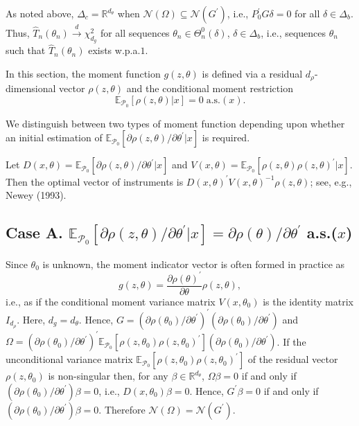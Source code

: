 \documentclass[hidelinks, 11 pt, a4paper, pdflatex]{article}
\begin{document}
{  \setcounter{equation}{0}

  \indent As noted above, $\Delta_{c} = \mathbb{R}^{d_{\theta }}$ when $\mathcal{N}(\Omega) \subseteq \mathcal{N}(G^{\prime})$, i.e., $P_{0}^{\prime}G\delta = 0$ for all $\delta \in \Delta_{b}$. Thus, $\hat{T}_{n}(\theta_{n}) \overset{d}{\rightarrow} \chi_{d_{g}}^{2}$ for all sequences $\theta_{n} \in \Theta_{n}^{0}(\delta)$, $\delta \in \Delta_{b}$, i.e., sequences $\theta_{n}$ such that $\hat{T}_{n}(\theta_{n})$ exists w.p.a.$1$.

  In this section, the moment function $g(z,\theta )$ is defined via a residual $d_{\rho}$-dimensional vector $\rho(z,\theta)$ and the conditional moment restriction
   \[
    \mathbb{E}_{\mathcal{P}_{0}}[\rho(z,\theta)|x] = 0 \; \text{a.s.}(x).
   \]

  We distinguish between two types of moment function depending upon whether an initial estimation of $\mathbb{E}_{\mathcal{P}_{0}}[\partial \rho(z,\theta)/\partial \theta^{\prime}|x]$ is required.

  Let $D(x,\theta) = \mathbb{E}_{\mathcal{P}_{0}}[\partial \rho(z,\theta)/\partial \theta^{\prime }|x]$ and $V(x,\theta) = \mathbb{E}_{\mathcal{P}_{0}}[\rho(z,\theta)\rho(z,\theta)^{\prime}|x]$. Then the optimal vector of instruments is $D(x,\theta)^{\prime}V(x,\theta)^{-1}\rho(z,\theta)$; see, e.g., Newey (1993).


  \subsection{Case A. $\mathbb{E}_{\mathcal{P}_{0}}[\partial \rho (z,\theta )/\partial \theta^{\prime}|x] = \partial \rho(\theta)/\partial \theta^{\prime}$ a.s.($x$)}

   Since $\theta_{0}$ is unknown, the moment indicator vector is often formed in practice as
    \[
     g(z,\theta) = \frac{\partial \rho(\theta)^{\prime}}{\partial \theta} \rho(z,\theta),
    \]
  i.e., as if the conditional moment variance matrix $V(x,\theta_0)$ is the identity matrix $I_{d_{\rho}}$. Here, $d_{g} = d_{\theta}$. Hence, $G = (\partial \rho(\theta_{0})/\partial \theta^{\prime})^{\prime}(\partial \rho(\theta_{0})/\partial \theta^{\prime})$ and $\Omega = (\partial \rho(\theta_{0})/\partial \theta^{\prime})^{\prime}\mathbb{E}_{\mathcal{P}_{0}}[\rho(z,\theta_{0})\rho(z,\theta_{0})^{\prime}](\partial \rho(\theta_{0})/\partial \theta^{\prime })$. If the unconditional variance matrix $\mathbb{E}_{\mathcal{P}_{0}}[\rho(z,\theta_{0})\rho(z,\theta_{0})^{\prime}]$ of the residual vector $\rho(z,\theta_{0})$ is non-singular then, for any $\beta \in \mathbb{R}^{d_{\theta}}$, $\Omega \beta = 0$ if and only if $(\partial \rho(\theta_{0})/\partial \theta^{\prime})\beta = 0$, i.e., $D(x,\theta_{0})\beta = 0$. Hence, $G^{\prime}\beta = 0$ if and only if $(\partial \rho(\theta_{0})/\partial \theta^{\prime})\beta = 0$. Therefore $\mathcal{N}(\Omega) = \mathcal{N}(G^{\prime})$.

}
\end{document}

